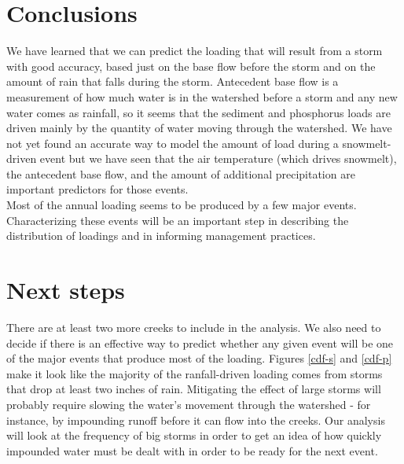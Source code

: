 \documentclass[12pt]{article}
\begin{document}
\section{Conclusions}
We have learned that we can predict the loading that will result from a storm with good accuracy, based just on the base flow before the storm and on the amount of rain that falls during the storm. Antecedent base flow is a measurement of how much water is in the watershed before a storm and any new water comes as rainfall, so it seems that the sediment and phosphorus loads are driven mainly by the quantity of water moving through the watershed. We have not yet found an accurate way to model the amount of load during a snowmelt-driven event but we have seen that the air temperature (which drives snowmelt), the antecedent base flow, and the amount of additional precipitation are important predictors for those events.\\

Most of the annual loading seems to be produced by a few major events. Characterizing these events will be an important step in describing the distribution of loadings and in informing management practices.\\

\section{Next steps}
There are at least two more creeks to include in the analysis. We also need to decide if there is an effective way to predict whether any given event will be one of the major events that produce most of the loading. Figures \ref{cdf-s} and \ref{cdf-p} make it look like the majority of the ranfall-driven loading comes from storms that drop at least two inches of rain. Mitigating the effect of large storms will probably require slowing the water's movement through the watershed - for instance, by impounding runoff before it can flow into the creeks. Our analysis will look at the frequency of big storms in order to get an idea of how quickly impounded water must be dealt with in order to be ready for the next event.
\end{document}
